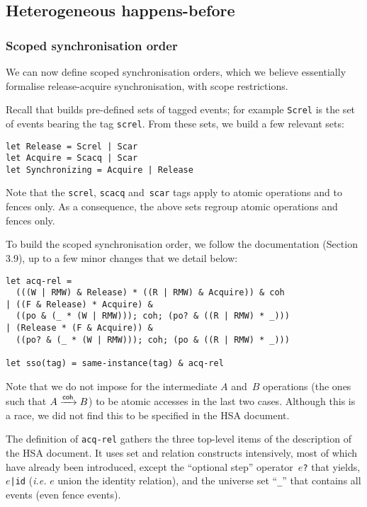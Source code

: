 \documentclass[a4paper]{article}
\begin{document}
\pagebreak
\subsection{Heterogeneous happens-before}

\subsubsection{Scoped synchronisation order \label{sso}}

We can now define scoped synchronisation orders, which we believe essentially
formalise release-acquire synchronisation, with scope restrictions. 

Recall that  builds pre-defined sets of tagged events; for example
{\tt Screl} is the set of events bearing the tag {\tt screl}. From these sets,
we build a few relevant sets:
\begin{verbatim}
let Release = Screl | Scar
let Acquire = Scacq | Scar
let Synchronizing = Acquire | Release
\end{verbatim}

Note that the \texttt{screl}, \texttt{scacq} and~\texttt{scar} tags apply to
atomic operations and to fences only. As a consequence, the above sets regroup
atomic operations and fences only.

To build the scoped synchronisation order, we follow the documentation (Section
3.9), up to a few minor changes that we detail below:
\begin{verbatim}
let acq-rel =
  (((W | RMW) & Release) * ((R | RMW) & Acquire)) & coh
| ((F & Release) * Acquire) &
  ((po & (_ * (W | RMW))); coh; (po? & ((R | RMW) * _)))
| (Release * (F & Acquire)) &
  ((po? & (_ * (W | RMW))); coh; (po & ((R | RMW) * _)))

let sso(tag) = same-instance(tag) & acq-rel
\end{verbatim}

Note that we do not impose for the intermediate $A$ and~$B$ operations (the
ones such that $A \xrightarrow{\textsf{\scriptsize{}coh}} B$) to be atomic accesses in the last two cases.
Although this is a race, we did not find this to be specified in the HSA
document. %

The definition of \texttt{acq-rel} gathers the three top-level items of the
description of the HSA document.  It uses set and relation constructs
intensively, most of which have already been introduced, except the ``optional
step'' operator~\texttt{$e$?} that yields, \texttt{$e$|id} (\emph{i.e.} $e$
union the identity relation), and the universe set ``\verb+_+'' that contains
all events (even fence events).
\end{document}
